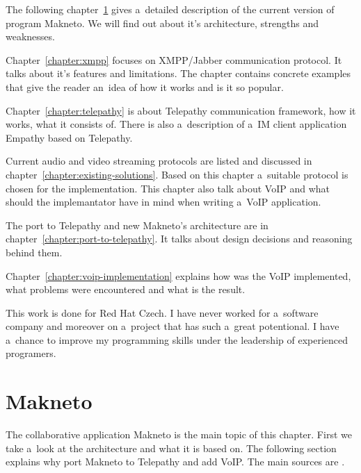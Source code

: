 The following chapter~\ref{chapter:makneto} gives a~detailed description of the current version of program Makneto. We will find out about it's architecture, strengths and weaknesses. 

Chapter~\ref{chapter:xmpp} focuses on XMPP/Jabber communication protocol. It talks about it's features and limitations. The chapter contains concrete examples that give the reader an~idea of how it works and is it so popular.

Chapter~\ref{chapter:telepathy} is about Telepathy communication framework, how it works, what it consists of. There is also a~description of a~IM client application Empathy based on Telepathy. 

Current audio and video streaming protocols are listed and discussed in chapter~\ref{chapter:existing-solutions}. Based on this chapter a~suitable protocol is chosen for the implementation. This chapter also talk about VoIP and what should the implemantator have in mind when writing a~VoIP application.

The port to Telepathy and new Makneto's architecture are in chapter~\ref{chapter:port-to-telepathy}. It talks about design decisions and reasoning behind them. 

Chapter~\ref{chapter:voip-implementation} explains how was the VoIP implemented, what problems were encountered and what is the result.  

This work is done for Red Hat Czech. I have never worked for a~software company and moreover on a~project that has such a~great potentional. I have a~chance to improve my programming skills under the leadership of experienced programers.



\chapter{Makneto}\label{chapter:makneto}
The collaborative application Makneto is the main topic of this chapter. First we take a~look at the architecture and what it is based on. The following section explains why port Makneto to Telepathy and add VoIP. The main sources are \cite{makneto,qtBook,SVGtiny}. 
   
